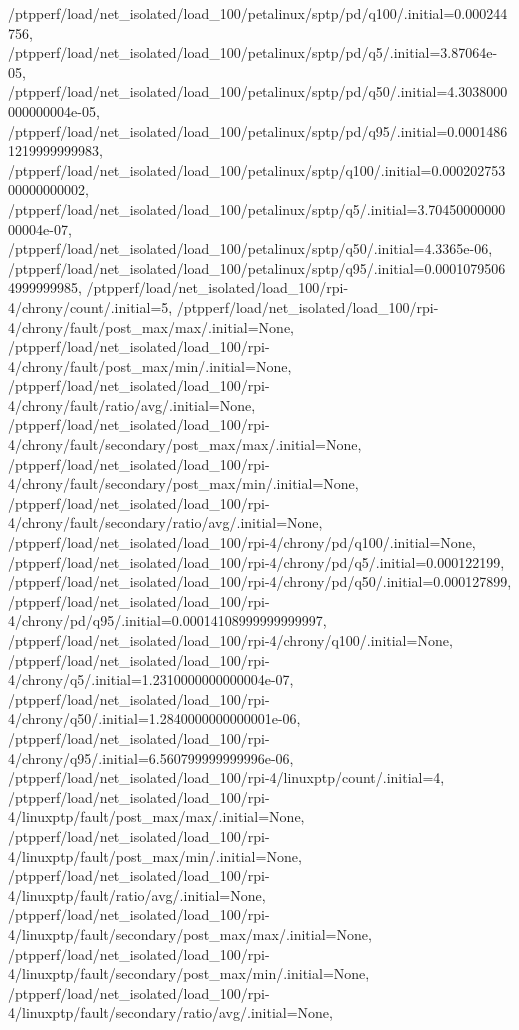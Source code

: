 {    /ptpperf/load/net_isolated/load_100/petalinux/sptp/pd/q100/.initial=0.000244756,
    /ptpperf/load/net_isolated/load_100/petalinux/sptp/pd/q5/.initial=3.87064e-05,
    /ptpperf/load/net_isolated/load_100/petalinux/sptp/pd/q50/.initial=4.3038000000000004e-05,
    /ptpperf/load/net_isolated/load_100/petalinux/sptp/pd/q95/.initial=0.00014861219999999983,
    /ptpperf/load/net_isolated/load_100/petalinux/sptp/q100/.initial=0.00020275300000000002,
    /ptpperf/load/net_isolated/load_100/petalinux/sptp/q5/.initial=3.7045000000000004e-07,
    /ptpperf/load/net_isolated/load_100/petalinux/sptp/q50/.initial=4.3365e-06,
    /ptpperf/load/net_isolated/load_100/petalinux/sptp/q95/.initial=0.00010795064999999985,
    /ptpperf/load/net_isolated/load_100/rpi-4/chrony/count/.initial=5,
    /ptpperf/load/net_isolated/load_100/rpi-4/chrony/fault/post_max/max/.initial=None,
    /ptpperf/load/net_isolated/load_100/rpi-4/chrony/fault/post_max/min/.initial=None,
    /ptpperf/load/net_isolated/load_100/rpi-4/chrony/fault/ratio/avg/.initial=None,
    /ptpperf/load/net_isolated/load_100/rpi-4/chrony/fault/secondary/post_max/max/.initial=None,
    /ptpperf/load/net_isolated/load_100/rpi-4/chrony/fault/secondary/post_max/min/.initial=None,
    /ptpperf/load/net_isolated/load_100/rpi-4/chrony/fault/secondary/ratio/avg/.initial=None,
    /ptpperf/load/net_isolated/load_100/rpi-4/chrony/pd/q100/.initial=None,
    /ptpperf/load/net_isolated/load_100/rpi-4/chrony/pd/q5/.initial=0.000122199,
    /ptpperf/load/net_isolated/load_100/rpi-4/chrony/pd/q50/.initial=0.000127899,
    /ptpperf/load/net_isolated/load_100/rpi-4/chrony/pd/q95/.initial=0.00014108999999999997,
    /ptpperf/load/net_isolated/load_100/rpi-4/chrony/q100/.initial=None,
    /ptpperf/load/net_isolated/load_100/rpi-4/chrony/q5/.initial=1.2310000000000004e-07,
    /ptpperf/load/net_isolated/load_100/rpi-4/chrony/q50/.initial=1.2840000000000001e-06,
    /ptpperf/load/net_isolated/load_100/rpi-4/chrony/q95/.initial=6.560799999999996e-06,
    /ptpperf/load/net_isolated/load_100/rpi-4/linuxptp/count/.initial=4,
    /ptpperf/load/net_isolated/load_100/rpi-4/linuxptp/fault/post_max/max/.initial=None,
    /ptpperf/load/net_isolated/load_100/rpi-4/linuxptp/fault/post_max/min/.initial=None,
    /ptpperf/load/net_isolated/load_100/rpi-4/linuxptp/fault/ratio/avg/.initial=None,
    /ptpperf/load/net_isolated/load_100/rpi-4/linuxptp/fault/secondary/post_max/max/.initial=None,
    /ptpperf/load/net_isolated/load_100/rpi-4/linuxptp/fault/secondary/post_max/min/.initial=None,
    /ptpperf/load/net_isolated/load_100/rpi-4/linuxptp/fault/secondary/ratio/avg/.initial=None,
}
